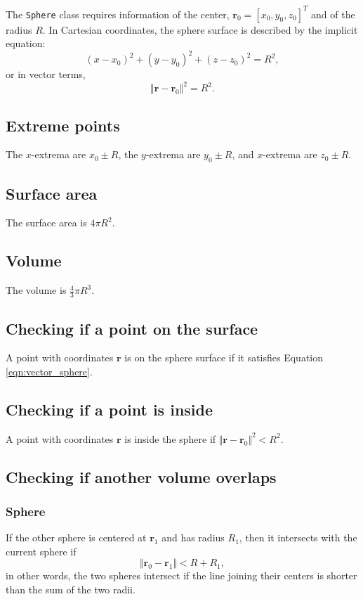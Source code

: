 The \lstinline|Sphere| class requires information of the center, $\bm{r}_0 = [x_0, y_0, z_0]^T$ and of the radius $R$. In Cartesian coordinates, the sphere surface is described by the implicit equation:
\begin{equation}
    (x - x_0)^2 + (y - y_0)^2 + (z - z_0)^2 = R^2,
    \label{eqn:implicit_sphere}
\end{equation}
or in vector terms,
\begin{equation}
    \Vert \bm{r} - \bm{r}_0 \Vert^2 = R^2.
    \label{eqn:vector_sphere}
\end{equation}

\subsection{Extreme points}
The $x$-extrema are $x_0 \pm R$, the $y$-extrema are $y_0 \pm R$, and $x$-extrema are $z_0 \pm R$.

\subsection{Surface area}
The surface area is $4\pi R^2$.

\subsection{Volume}
The volume is $\displaystyle \frac{4}{3}\pi R^3$.

\subsection{Checking if a point on the surface}
A point with coordinates $\bm{r}$ is on the sphere surface if it satisfies Equation \ref{eqn:vector_sphere}.

\subsection{Checking if a point is inside}
A point with coordinates $\bm{r}$ is inside the sphere if $\Vert \bm{r} - \bm{r}_0 \Vert^2 < R^2$.

\subsection{Checking if another volume overlaps}
\label{sect:collision_test_sphere}
\subsubsection{Sphere}
If the other sphere is centered at $\bm{r}_1$ and has radius $R_1$, then it intersects with the current sphere if
\begin{equation}
    \Vert \bm{r}_0 - \bm{r}_1 \Vert < R + R_1,
\end{equation}
in other words, the two spheres intersect if the line joining their centers is shorter than the sum of the two radii.

